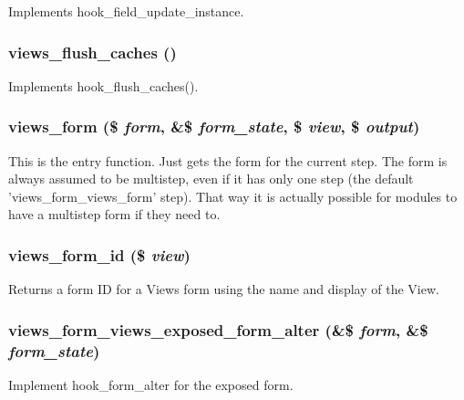 \label{views_8module_aad19a47ddacc5b8344e42a6ff92b7c4f}
Implements hook\_\-field\_\-update\_\-instance. \hypertarget{views_8module_acb54c1ed22df1323d1191cc3ff0c6891}{
\subsubsection[{views\_\-flush\_\-caches}]{\setlength{\rightskip}{0pt plus 5cm}views\_\-flush\_\-caches ()}}
\label{views_8module_acb54c1ed22df1323d1191cc3ff0c6891}
Implements hook\_\-flush\_\-caches(). \hypertarget{views_8module_ad2b3623cab717e77713170df21927c92}{
\subsubsection[{views\_\-form}]{\setlength{\rightskip}{0pt plus 5cm}views\_\-form (\$ {\em form}, \/  \&\$ {\em form\_\-state}, \/  \$ {\em view}, \/  \$ {\em output})}}
\label{views_8module_ad2b3623cab717e77713170df21927c92}
This is the entry function. Just gets the form for the current step. The form is always assumed to be multistep, even if it has only one step (the default 'views\_\-form\_\-views\_\-form' step). That way it is actually possible for modules to have a multistep form if they need to. \hypertarget{views_8module_abd283e66b3b172682b7a1fe2b59fbca9}{
\subsubsection[{views\_\-form\_\-id}]{\setlength{\rightskip}{0pt plus 5cm}views\_\-form\_\-id (\$ {\em view})}}
\label{views_8module_abd283e66b3b172682b7a1fe2b59fbca9}
Returns a form ID for a Views form using the name and display of the View. \hypertarget{views_8module_a1b2f933056d6e97e743b462d39e1d535}{
\subsubsection[{views\_\-form\_\-views\_\-exposed\_\-form\_\-alter}]{\setlength{\rightskip}{0pt plus 5cm}views\_\-form\_\-views\_\-exposed\_\-form\_\-alter (\&\$ {\em form}, \/  \&\$ {\em form\_\-state})}}
\label{views_8module_a1b2f933056d6e97e743b462d39e1d535}
Implement hook\_\-form\_\-alter for the exposed form.

